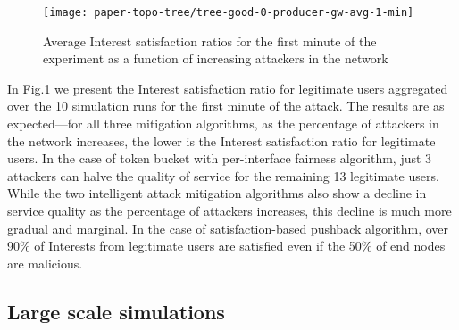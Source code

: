 
\begin{figure}[htbp]
  \centering
  \texttt{[image: paper-topo-tree/tree-good-0-producer-gw-avg-1-min]}
  \vspace{-.3cm}
  \caption{Average Interest satisfaction ratios for the first minute of the experiment as a function of increasing attackers in the network}\vspace{-.1cm}
  \label{fig:small-scale-topo boxplot}
\end{figure}

In Fig.\ref{fig:small-scale-topo boxplot} we present  the Interest satisfaction ratio for legitimate users aggregated over the 10 simulation runs for the first minute of the attack. The results are as expected---for all three mitigation algorithms, as the percentage of attackers in the network increases, the lower is the Interest satisfaction ratio for legitimate users.
In the case of token bucket with per-interface fairness algorithm, just 3 attackers can halve the quality of service for the remaining 13 legitimate users. While the two intelligent attack mitigation algorithms also show a decline in service quality as the percentage of attackers increases, this decline is much more gradual and marginal. In the case of satisfaction-based pushback algorithm, over 90\% of Interests from legitimate users are satisfied even if the 50\% of end nodes are malicious.  
 




\subsection{Large scale simulations}
\label{sec:largescale}

